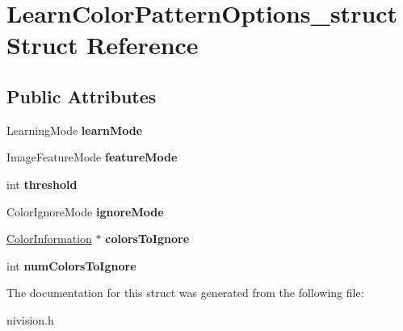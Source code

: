 \hypertarget{structLearnColorPatternOptions__struct}{
\section{LearnColorPatternOptions\_\-struct Struct Reference}
\label{structLearnColorPatternOptions__struct}
}
\subsection*{Public Attributes}
\begin{DoxyCompactItemize}
\item 
\hypertarget{structLearnColorPatternOptions__struct_ad0c016ef0cc486c5bac39d274aea33b1}{
LearningMode {\bfseries learnMode}}
\label{structLearnColorPatternOptions__struct_ad0c016ef0cc486c5bac39d274aea33b1}

\item 
\hypertarget{structLearnColorPatternOptions__struct_aca40d70840573519413c5963529535f7}{
ImageFeatureMode {\bfseries featureMode}}
\label{structLearnColorPatternOptions__struct_aca40d70840573519413c5963529535f7}

\item 
\hypertarget{structLearnColorPatternOptions__struct_a18b4f4e1c391f98ab937effa141f631e}{
int {\bfseries threshold}}
\label{structLearnColorPatternOptions__struct_a18b4f4e1c391f98ab937effa141f631e}

\item 
\hypertarget{structLearnColorPatternOptions__struct_ae8b22445bf75cc0275d4a0aec85af6d4}{
ColorIgnoreMode {\bfseries ignoreMode}}
\label{structLearnColorPatternOptions__struct_ae8b22445bf75cc0275d4a0aec85af6d4}

\item 
\hypertarget{structLearnColorPatternOptions__struct_ab1df6e206279b2c3be1c80eb86e0e92b}{
\hyperlink{structColorInformation__struct}{ColorInformation} $\ast$ {\bfseries colorsToIgnore}}
\label{structLearnColorPatternOptions__struct_ab1df6e206279b2c3be1c80eb86e0e92b}

\item 
\hypertarget{structLearnColorPatternOptions__struct_ad95d28e72bf3bfef281b2c3a4cd70827}{
int {\bfseries numColorsToIgnore}}
\label{structLearnColorPatternOptions__struct_ad95d28e72bf3bfef281b2c3a4cd70827}

\end{DoxyCompactItemize}


The documentation for this struct was generated from the following file:\begin{DoxyCompactItemize}
\item 
nivision.h\end{DoxyCompactItemize}
